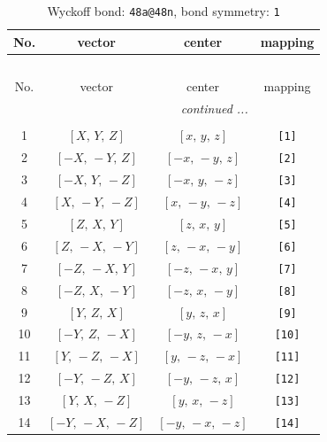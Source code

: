\documentclass[fleqn,8pt]{jsarticle}
\begin{document}
\begin{longtable}{cccc}
\caption{Wyckoff bond: {\tt 48a@48n}, bond symmetry: {\tt 1}}
 \\
 \hline \hline
No. & vector & center & mapping \\ \hline \endfirsthead

\multicolumn{3}{l}{\tablename\ \thetable{}} \\
 \hline \hline
No. & vector & center & mapping \\ \hline \endhead

 \hline \hline
\multicolumn{3}{r}{\footnotesize\it continued ...} \\ \endfoot

 \hline \hline
\multicolumn{3}{r}{} \\ \endlastfoot

1 & $\left[ X,\, Y,\, Z \right]$ & $\left[ x,\, y,\, z \right]$ & {\tt [1]} \\ \hline
2 & $\left[ - X,\, - Y,\, Z \right]$ & $\left[ - x,\, - y,\, z \right]$ & {\tt [2]} \\ \hline
3 & $\left[ - X,\, Y,\, - Z \right]$ & $\left[ - x,\, y,\, - z \right]$ & {\tt [3]} \\ \hline
4 & $\left[ X,\, - Y,\, - Z \right]$ & $\left[ x,\, - y,\, - z \right]$ & {\tt [4]} \\ \hline
5 & $\left[ Z,\, X,\, Y \right]$ & $\left[ z,\, x,\, y \right]$ & {\tt [5]} \\ \hline
6 & $\left[ Z,\, - X,\, - Y \right]$ & $\left[ z,\, - x,\, - y \right]$ & {\tt [6]} \\ \hline
7 & $\left[ - Z,\, - X,\, Y \right]$ & $\left[ - z,\, - x,\, y \right]$ & {\tt [7]} \\ \hline
8 & $\left[ - Z,\, X,\, - Y \right]$ & $\left[ - z,\, x,\, - y \right]$ & {\tt [8]} \\ \hline
9 & $\left[ Y,\, Z,\, X \right]$ & $\left[ y,\, z,\, x \right]$ & {\tt [9]} \\ \hline
10 & $\left[ - Y,\, Z,\, - X \right]$ & $\left[ - y,\, z,\, - x \right]$ & {\tt [10]} \\ \hline
11 & $\left[ Y,\, - Z,\, - X \right]$ & $\left[ y,\, - z,\, - x \right]$ & {\tt [11]} \\ \hline
12 & $\left[ - Y,\, - Z,\, X \right]$ & $\left[ - y,\, - z,\, x \right]$ & {\tt [12]} \\ \hline
13 & $\left[ Y,\, X,\, - Z \right]$ & $\left[ y,\, x,\, - z \right]$ & {\tt [13]} \\ \hline
14 & $\left[ - Y,\, - X,\, - Z \right]$ & $\left[ - y,\, - x,\, - z \right]$ & {\tt [14]} \\ \hline

\end{longtable}
\end{document}
